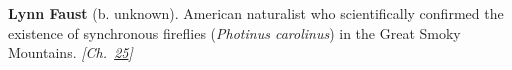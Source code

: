 \textbf{Lynn Faust} (b. unknown). American naturalist who scientifically confirmed the existence of synchronous fireflies (\emph{Photinus carolinus}) in the Great Smoky Mountains. \emph{[Ch.~\hyperref[ch:fireflybioluminescence]{25}]}

